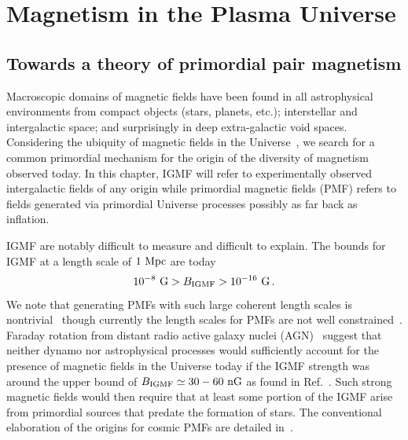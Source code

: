 \section{Magnetism in the Plasma Universe}%
\label{sec:mag:universe}
\subsection{Towards a theory of primordial pair magnetism}
\label{sec:theory}
Macroscopic domains of magnetic fields have been found in all astrophysical environments from compact objects (stars, planets, etc.); interstellar and intergalactic space; and surprisingly in deep extra-galactic void spaces. Considering the ubiquity of magnetic fields in the Universe~\cite{Giovannini:2017rbc,Giovannini:2003yn,Kronberg:1993vk}, we search for a common primordial mechanism for the origin of the diversity of magnetism observed today. In this chapter, IGMF will refer to experimentally observed intergalactic fields of any origin while primordial magnetic fields (PMF) refers to fields generated via primordial Universe processes possibly as far back as inflation.

IGMF are notably difficult to measure and difficult to explain. The bounds for IGMF at a length scale of $1{\rm\ Mpc}$ are today~\cite{Neronov:2010gir,Taylor:2011bn,Pshirkov:2015tua,Jedamzik:2018itu,Vernstrom:2021hru}
\begin{gather}
 \label{igmf}
 10^{-8}{\rm\ G}>B_\mathrm{IGMF}>10^{-16}{\rm\ G}\,.
\end{gather}
We note that generating PMFs with such large coherent length scales is nontrivial~\cite{Giovannini:2022rrl} though currently the length scales for PMFs are not well constrained~\cite{AlvesBatista:2021sln}. Faraday rotation from distant radio active galaxy nuclei (AGN)~\cite{Pomakov:2022cem} suggest that neither dynamo nor astrophysical processes would sufficiently account for the presence of magnetic fields in the Universe today if the IGMF strength was around the upper bound of $B_\mathrm{IGMF}\simeq30-60{\rm\ nG}$ as found in Ref.~\cite{Vernstrom:2021hru}. Such strong magnetic fields would then require that at least some portion of the IGMF arise from primordial sources that predate the formation of stars. The conventional elaboration of the origins for cosmic PMFs are detailed in~\cite{Gaensler:2004gk,Durrer:2013pga,AlvesBatista:2021sln}.

